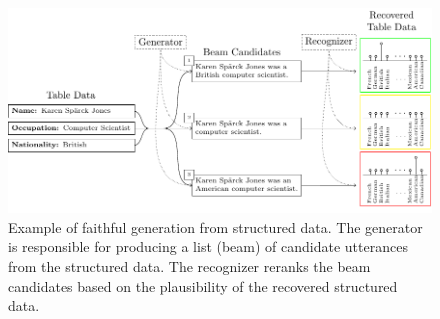 \begin{figure}
 \centering
 \includegraphics{images/faithful_generation/example1.pdf}
 \caption{Example of faithful generation from structured data. The generator
 is responsible for producing a list (beam) of candidate utterances from the 
 structured data. The recognizer reranks the beam candidates based on the 
 plausibility of the recovered structured data. }
 \label{fig:fgen_example1}
\end{figure}
